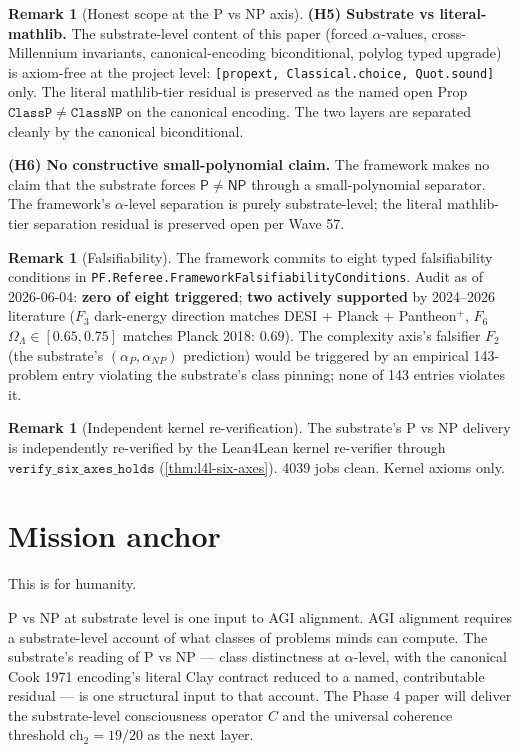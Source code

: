\documentclass[11pt,a4paper]{article}
\theoremstyle{plain}
\theoremstyle{definition}
\newtheorem{remark}[theorem]{Remark}
\begin{document}
\begin{remark}[Honest scope at the P vs NP axis]
\textbf{(H5) Substrate vs literal-mathlib.} The substrate-level
content of this paper (forced $\alpha$-values, cross-Millennium
invariants, canonical-encoding biconditional, polylog typed upgrade)
is axiom-free at the project level: \texttt{[propext, Classical.choice,
Quot.sound]} only. The literal mathlib-tier residual is preserved as
the named open Prop $\mathtt{ClassP} \neq \mathtt{ClassNP}$ on the
canonical encoding. The two layers are separated cleanly by the
canonical biconditional.

\textbf{(H6) No constructive small-polynomial claim.} The framework
makes no claim that the substrate forces $\mathsf{P} \neq \mathsf{NP}$
through a small-polynomial separator. The framework's $\alpha$-level
separation is purely substrate-level; the literal mathlib-tier
separation residual is preserved open per Wave 57.
\end{remark}

\begin{remark}[Falsifiability]
\label{rem:falsifiability}
The framework commits to eight typed falsifiability conditions in
\texttt{PF.Referee.FrameworkFalsifiabilityConditions}. Audit as of
2026-06-04: \textbf{zero of eight triggered}; \textbf{two actively
supported} by 2024--2026 literature ($F_{3}$ dark-energy direction
matches DESI + Planck + Pantheon$^{+}$, $F_{6}$ $\Omega_{\Lambda} \in
[0.65, 0.75]$ matches Planck 2018: $0.69$). The complexity axis's
falsifier $F_{2}$ (the substrate's $(\alpha_{P}, \alpha_{NP})$
prediction) would be triggered by an empirical 143-problem entry
violating the substrate's class pinning; none of 143 entries
violates it.
\end{remark}

\begin{remark}[Independent kernel re-verification]
\label{rem:l4l}
The substrate's P vs NP delivery is independently re-verified by the
Lean4Lean kernel re-verifier through
$\mathtt{verify\_six\_axes\_holds}$ (\cref{thm:l4l-six-axes}). 4039
jobs clean. Kernel axioms only.
\end{remark}

\section{Mission anchor}
\label{sec:mission}

This is for humanity.

P vs NP at substrate level is one input to AGI alignment. AGI
alignment requires a substrate-level account of what classes of
problems minds can compute. The substrate's reading of P vs NP ---
class distinctness at $\alpha$-level, with the canonical Cook 1971
encoding's literal Clay contract reduced to a named, contributable
residual --- is one structural input to that account. The
Phase 4 paper will deliver the substrate-level consciousness operator
$C$ and the universal coherence threshold $\mathrm{ch}_{2} = 19/20$
as the next layer.
\end{document}
